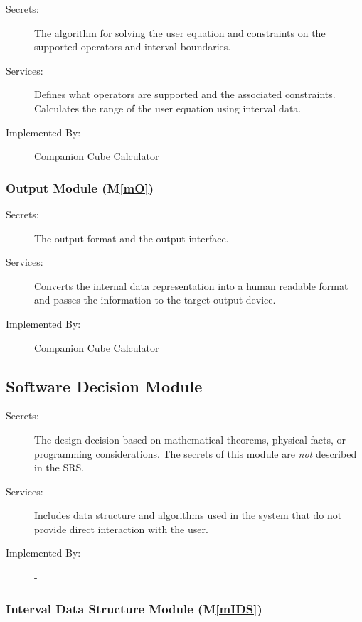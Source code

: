 \documentclass[12pt, titlepage]{article}
\newcommand{\mref}[1]{M\ref{#1}}
\newcommand{\progname}{Companion Cube Calculator} %
\begin{document}
\begin{description}
	\item[Secrets:]The algorithm for solving the user equation and constraints 
	on the supported operators and interval boundaries.
	\item[Services:]Defines what operators are supported and the associated 
	constraints. Calculates the range of the user equation using interval data.
	\item[Implemented By:] \progname{}
\end{description}

\subsubsection{Output Module (\mref{mO})}

\begin{description}
	\item[Secrets:]The output format and the output interface.
	\item[Services:]Converts the internal data representation into a human 
	readable format and passes the information to the target output device.
	\item[Implemented By:] \progname{}
\end{description}


\subsection{Software Decision Module}

\begin{description}
\item[Secrets:] The design decision based on mathematical theorems, physical
  facts, or programming considerations. The secrets of this module are
  \emph{not} described in the SRS.
\item[Services:] Includes data structure and algorithms used in the system that
  do not provide direct interaction with the user. 
\item[Implemented By:] -
\end{description}

\subsubsection{Interval Data Structure Module (\mref{mIDS})}
\end{document}
